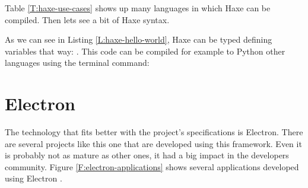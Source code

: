 Table \ref{T:haxe-use-cases} shows up many languages in which Haxe can be
compiled. Then lets see a bit of Haxe syntax.

\begin{codefigure}
\end{codefigure}

As we can see in Listing \ref{L:haxe-hello-world}, Haxe can be typed defining 
variables that way: . This code can be compiled
for example to Python other languages using the terminal command:

\begin{terminal}[caption=Haxe python transcompilation command, label=haxe-2-py]
%
%

\end{terminal}

\section{Electron}
\label{S:electron}

The technology that fits better with the project's specifications is Electron. 
There are several projects like this one that are developed using this 
framework. Even it is probably not as mature as other ones, it had a big impact 
in the developers community. Figure \ref{F:electron-applications} shows several
applications developed using Electron \cite{electron-web}.

